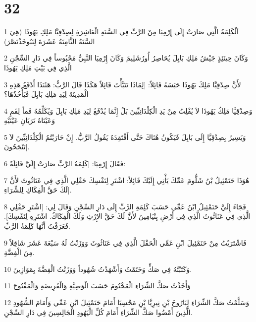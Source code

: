 \chapter{32}

\par 1 اَلْكَلِمَةُ الَّتِي صَارَتْ إِلَى إِرْمِيَا مِنْ الرَّبِّ فِي السَّنَةِ الْعَاشِرَةِ لِصِدْقِيَّا مَلِكِ يَهُوذَا (هِيَ السَّنَةُ الثَّامِنَةُ عَشَرَةَ لِنَبُوخَذْنَصَّرَ)
\par 2 وَكَانَ حِينَئِذٍ جَيْشُ مَلِكِ بَابِلَ يُحَاصِرُ أُورُشَلِيمَ وَكَانَ إِرْمِيَا النَّبِيُّ مَحْبُوساً فِي دَارِ السِّجْنِ الَّذِي فِي بَيْتِ مَلِكِ يَهُوذَا
\par 3 لأَنَّ صِدْقِيَّا مَلِكَ يَهُوذَا حَبَسَهُ قَائِلاً: [لِمَاذَا تَنَبَّأْتَ قَائِلاً هَكَذَا قَالَ الرَّبُّ: هَئَنَذَا أَدْفَعُ هَذِهِ الْمَدِينَةَ لِيَدِ مَلِكِ بَابِلَ فَيَأْخُذُهَا؟
\par 4 وَصِدْقِيَّا مَلِكُ يَهُوذَا لاَ يُفْلِتُ مِنْ يَدِ الْكِلْدَانِيِّينَ بَلْ إِنَّمَا يُدْفَعُ لِيَدِ مَلِكِ بَابِلَ وَيُكَلِّمُهُ فَماً لِفَمٍ وَعَيْنَاهُ تَرَيَانِ عَيْنَيْهِ
\par 5 وَيَسِيرُ بِصِدْقِيَّا إِلَى بَابِلَ فَيَكُونُ هُنَاكَ حَتَّى أَفْتَقِدَهُ يَقُولُ الرَّبُّ. إِنْ حَارَبْتُمُ الْكِلْدَانِيِّينَ لاَ تَنْجَحُونَ].
\par 6 فَقَالَ إِرْمِيَا: [كَلِمَةُ الرَّبِّ صَارَتْ إِلَيَّ قَائِلَةً:
\par 7 هُوَذَا حَنَمْئِيلُ بْنُ شَلُّومَ عَمِّكَ يَأْتِي إِلَيْكَ قَائِلاً: اشْتَرِ لِنَفْسِكَ حَقْلِي الَّذِي فِي عَنَاثُوثَ لأَنَّ لَكَ حَقَّ الْفِكَاكِ لِلشِّرَاءِ].
\par 8 فَجَاءَ إِلَيَّ حَنَمْئِيلُ ابْنُ عَمِّي حَسَبَ كَلِمَةِ الرَّبِّ إِلَى دَارِ السِّجْنِ وَقَالَ لِي: [اشْتَرِ حَقْلِي الَّذِي فِي عَنَاثُوثَ الَّذِي فِي أَرْضِ بِنْيَامِينَ لأَنَّ لَكَ حَقَّ الإِرْثِ وَلَكَ الْفِكَاكُ. اشْتَرِهِ لِنَفْسِكَ]. فَعَرَفْتُ أَنَّهَا كَلِمَةُ الرَّبِّ.
\par 9 فَاشْتَرَيْتُ مِنْ حَنَمْئِيلَ ابْنِ عَمِّي الْحَقْلَ الَّذِي فِي عَنَاثُوثَ وَوَزَنْتُ لَهُ سَبْعَةَ عَشَرَ شَاقِلاً مِنَ الْفِضَّةِ.
\par 10 وَكَتَبْتُهُ فِي صَكٍّ وَخَتَمْتُ وَأَشْهَدْتُ شُهُوداً وَوَزَنْتُ الْفِضَّةَ بِمَوَازِينَ.
\par 11 وَأَخَذْتُ صَكَّ الشِّرَاءِ الْمَخْتُومَ حَسَبَ الْوَصِيَّةِ وَالْفَرِيضَةِ وَالْمَفْتُوحَ
\par 12 وَسَلَّمْتُ صَكَّ الشِّرَاءِ لِبَارُوخَ بْنِ نِيرِيَّا بْنِ مَحْسِيَا أَمَامَ حَنَمْئِيلَ ابْنِ عَمِّي وَأَمَامَ الشُّهُودِ الَّذِينَ أَمْضُوا صَكَّ الشِّرَاءِ أَمَامَ كُلِّ الْيَهُودِ الْجَالِسِينَ فِي دَارِ السِّجْنِ.
